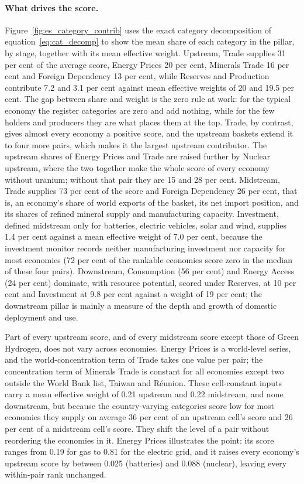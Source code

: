 \paragraph{What drives the score.} Figure~\ref{fig:es_category_contrib} uses the exact category
decomposition of equation~\eqref{eq:cat_decomp} to show the mean share of each category in the
pillar, by stage, together with its mean effective weight. Upstream, Trade supplies 31 per cent
of the average score, Energy Prices 20 per cent, Minerals Trade 16 per cent and Foreign
Dependency 13 per cent, while Reserves and Production contribute 7.2 and 3.1 per cent against
mean effective weights of 20 and 19.5 per cent. The gap between share and weight is the zero
rule at work: for the typical economy the register categories are zero and add nothing, while
for the few holders and producers they are what places them at the top. Trade, by contrast,
gives almost every economy a positive score, and the upstream baskets extend it to four more
pairs, which makes it the largest upstream contributor. The upstream shares of Energy Prices and
Trade are raised further by Nuclear upstream, where the two together make the whole score of
every economy without uranium; without that pair they are 15 and 28 per cent. Midstream, Trade
supplies 73 per cent of the score and Foreign Dependency 26 per cent, that is, an economy's
share of world exports of the basket, its net import position, and its shares of refined mineral
supply and manufacturing capacity. Investment, defined midstream only for batteries, electric
vehicles, solar and wind, supplies 1.4 per cent against a mean effective weight of 7.0 per cent,
because the investment monitor records neither manufacturing investment nor capacity for most
economies (72 per cent of the rankable economies score zero in the median of these four pairs).
Downstream, Consumption (56 per cent) and Energy Access (24 per cent) dominate, with resource
potential, scored under Reserves, at 10 per cent and Investment at 9.8 per cent against a weight
of 19 per cent; the downstream pillar is mainly a measure of the depth and growth of domestic
deployment and use.

Part of every upstream score, and of every midstream score except those of Green Hydrogen, does
not vary across economies. Energy Prices is a world-level series, and the world-concentration
term of Trade takes one value per pair; the concentration term of Minerals Trade is constant for
all economies except two outside the World Bank list, Taiwan and R\'eunion. These cell-constant
inputs carry a mean effective weight of 0.21 upstream and 0.22 midstream, and none downstream,
but because the country-varying categories score low for most economies they supply on average
36 per cent of an upstream cell's score and 26 per cent of a midstream cell's score. They shift
the level of a pair without reordering the economies in it. Energy Prices illustrates the point:
its score ranges from 0.19 for gas to 0.81 for the electric grid, and it raises every economy's
upstream score by between 0.025 (batteries) and 0.088 (nuclear), leaving every within-pair rank
unchanged.

